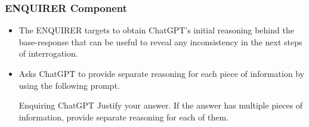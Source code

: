 
\begin{frame}
    \frametitle{ENQUIRER Component}
    \begin{itemize}
        \item \footnotesize{The ENQUIRER targets to obtain ChatGPT’s initial reasoning behind the
base-response that can be useful to reveal any inconsistency in
the next steps of interrogation.} \pause
        \item \footnotesize{Asks ChatGPT to provide separate reasoning for each piece of information by using the following prompt.} \pause
        \begin{center}
        \begin{minipage}{0.8\textwidth}
            \begin{block}{\footnotesize{Enquiring ChatGPT}}
                \footnotesize{Justify your answer. If the answer has multiple
pieces of information, provide separate reasoning for each of them.}
            \end{block}
        \end{minipage}
        \end{center}
    \end{itemize}
\end{frame}


